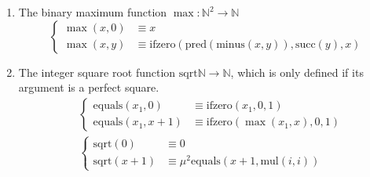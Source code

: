 \documentclass[10pt,\jkfside,a4paper]{article}
\begin{document}
\begin{enumerate}

\item The binary maximum function $\max:\mathbb{N}^2 \to \mathbb{N}$
\[
\begin{cases}
\max(x, 0) &\equiv x \\
\max(x, y) &\equiv \text{ifzero}(\text{pred}(\text{minus}(x, y)), \text{succ}(y), x)
\end{cases}
\]

\item The integer square root function $\text{sqrt} \mathbb{N} \to
\mathbb{N}$, which is only defined if its argument is a perfect square.
\begin{align*}
&\begin{cases}
\text{equals}(x_1, 0) &\equiv \text{ifzero}(x_1, 0, 1) \\
\text{equals}(x_1, x + 1) &\equiv \text{ifzero}(\max(x_1, x), 0, 1)
\end{cases}\\
&\begin{cases}
\text{sqrt}(0) &\equiv 0 \\
\text{sqrt}(x + 1) &\equiv \mu^2\text{equals}(x + 1, \text{mul}(i, i))
\end{cases}
\end{align*}

\end{enumerate}
\end{document}
